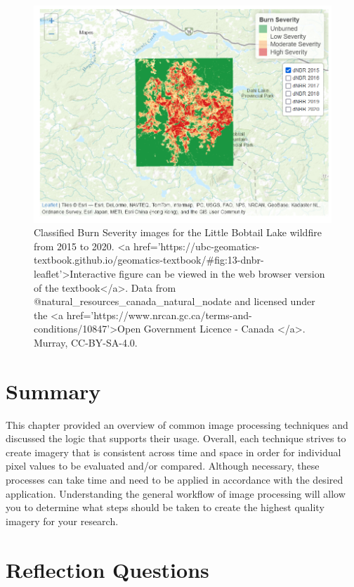 \documentclass[
]{book}
\begin{document}
\begin{figure}
\includegraphics[width=0.75\linewidth]{images/13-dnbr-leaflet} \caption{Classified Burn Severity images for the Little Bobtail Lake wildfire from 2015 to 2020. <a
  href='https://ubc-geomatics-textbook.github.io/geomatics-textbook/#fig:13-dnbr-leaflet'>Interactive figure can be viewed in the web browser version of the textbook</a>. Data from @natural_resources_canada_natural_nodate and licensed under the <a href='https://www.nrcan.gc.ca/terms-and-conditions/10847'>Open Government Licence - Canada </a>. Murray, CC-BY-SA-4.0.}\label{fig:13-dnbr-leaflet}
\end{figure}

\section{Summary}\label{summary-4}

This chapter provided an overview of common image processing techniques and discussed the logic that supports their usage. Overall, each technique strives to create imagery that is consistent across time and space in order for individual pixel values to be evaluated and/or compared. Although necessary, these processes can take time and need to be applied in accordance with the desired application. Understanding the general workflow of image processing will allow you to determine what steps should be taken to create the highest quality imagery for your research.

\section*{Reflection Questions}\label{reflection-questions-8}
\end{document}
